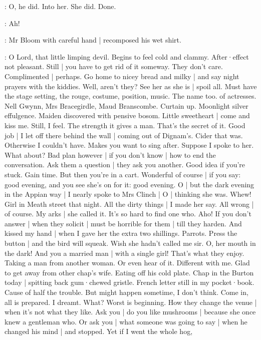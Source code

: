 :
O,
he did.
Into her.
She did.
Done.

\Bloom:
Ah!%

:
Mr Bloom with careful hand |
recomposed his wet shirt.

\Bloom:
O Lord,
that little limping devil.
Begins to feel cold and clammy.
After·effect not pleasant.
Still |
you have to get rid of it someway.
They don't care.
Complimented |
perhaps.
Go home to nicey bread and milky |
and say night prayers with the kiddies.
Well,
aren't they?
See her as she is |
spoil all.
Must have the stage setting,
the rouge,
costume,
position,
music.
The name too.
 of actresses.
Nell Gwynn,
Mrs Bracegirdle,
Maud Branscombe.
Curtain up.
Moonlight silver effulgence.
Maiden discovered with pensive bosom.
Little sweetheart |
come and kiss me.
Still,
I feel.
The strength it gives a man.
That's the secret of it.%
Good job |
I let off there behind the wall |
coming out of Dignam's.
Cider that was.
Otherwise I couldn't have.
Makes you want to sing after.
Suppose I spoke to her.
What about?
Bad plan however |
if you don't know |
how to end the conversation.
Ask them a question |
they ask you another.
Good idea
if you're stuck.
Gain time.
But then you're in a cart.
Wonderful of course |
if you say:
good evening,
and you see she's on for it:
good evening.
O |
but the dark evening in the Appian way |
I nearly spoke to Mrs Clinch |
O |
thinking she was.
Whew!
Girl in Meath street that night.
All the dirty things |
I made her say.
All wrong |
of course.
My arks |
she called it.
It's so hard to find one who.
Aho!
If you don't answer |
when they solicit |
must be horrible for them |%
till they harden.
And kissed my hand |
when I gave her the extra two shillings.
Parrots.
Press the button |
and the bird will squeak.
Wish she hadn't called me sir.
O,
her mouth in the dark!
And you a married man |
with a single girl!
That's what they enjoy.
Taking a man from another woman.
Or even hear of it.
Different with me.
Glad to get away from other chap's wife.
Eating off his cold plate.
Chap in the Burton today |
spitting back gum·chewed gristle.
French letter still in my pocket·book.
Cause of half the trouble.
But might happen sometime,
I don't think.
Come in,
all is prepared.
I dreamt.
What?
Worst is beginning.
How they change the venue |
when it's not what they like.%
Ask you |
do you like mushrooms |
because she once knew a gentleman who.
Or ask you |
what someone was going to say |
when he changed his mind |
and stopped.
Yet if I went the whole hog,

